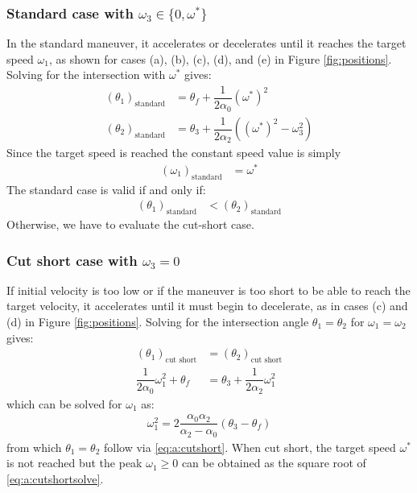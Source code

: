 \documentclass[12pt, a4paper]
{article}
\providecommand{\lr}[1]{\left(#1\right)}
\providecommand{\sub}[1]{_{\text{#1}}}
\providecommand{\w}{\omega}
\providecommand{\wt}{\w^*}
\renewcommand{\th}{\theta}
\renewcommand{\a}{\alpha}
\begin{document}
\subsubsection{Standard case with $\w_3 \in \{0, \wt\}$}
\label{sec:a:standard}
In the standard maneuver, it accelerates or decelerates
until it reaches the target speed $\w_1$, as shown for cases (a), (b), (c),
(d), and (e) in Figure \ref{fig:positions}. 
Solving for the intersection with $\wt$ gives:
%
\begin{align}
    \label{eq:a:t1mt0:standard}
    \lr{\th_1}\sub{standard} &= \th_f  + \dfrac{1}{2\a_0}(\wt)^2\\[1em]
    \lr{\th_2}\sub{standard} &= \th_3  + \dfrac{1}{2\a_2}\lr{(\wt)^2 - \w_3^2}
\end{align}
%
%
Since the target speed is reached the constant speed value is simply
\begin{align}
    \lr{\w_1}\sub{standard} &= \wt
\end{align}
%
The standard case is valid if and only if:
\begin{align}
    \label{eq:a:t1mt0:standardvalidity}
    \lr{\th_1}\sub{standard} &< \lr{\th_2}\sub{standard}
\end{align}
%
Otherwise, we have to evaluate the cut-short case.
%

\subsubsection{Cut short case with $\w_3 = 0$}
\label{sec:a:cutshortw3is0}
If initial velocity is too low or if the
maneuver is too short to be able to reach the target velocity, it accelerates
until it must begin to decelerate, as in cases (c) and (d) in
Figure \ref{fig:positions}.
Solving for the intersection angle $\th_1=\th_2$ for $\w_1=\w_2$ gives:
%
\begin{align}
    \label{eq:a:cutshort}
    \lr{\th_1}\sub{cut short} &= \lr{\th_2}\sub{cut short}\\[1em]
    \dfrac{1}{2\a_0}\w_1^2 + \th_f  &= \th_3 + \dfrac{1}{2\a_2} \w_1^2 
\end{align}
%
which can be solved for $\w_1$ as:
%
\begin{align}
    \label{eq:a:cutshortsolve}
    \w_1^2 = 2 \dfrac{\a_0\a_2}{\a_2-\a_0}\lr{\th_3 - \th_f}
\end{align}
%
from which $\th_1=\th_2$ follow via \eqref{eq:a:cutshort}.
%
When cut short, the target speed $\wt$ is not reached but the
peak $\w_1 \geq 0$ can be obtained as the square root
of \eqref{eq:a:cutshortsolve}.
%
\end{document}
